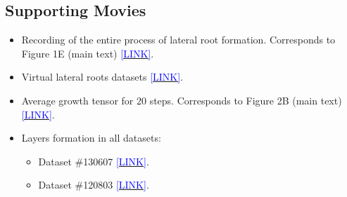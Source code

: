 \documentclass[11pt,a4paper, final]{article}
\newenvironment{Itemize}{
 \begin{itemize}[leftmargin=0.5cm]{
}}{\end{itemize}}
\begin{document}
%


\clearpage
\subsection{Supporting Movies}
\label{sec:suppmovies}

\begin{Itemize}
  \item Recording of the entire process of lateral root formation. Corresponds to Figure 1E (main text) \href{http://youtu.be/navcxqh7KCo}{\textcolor{blue}{[LINK]}}.
  \item Virtual lateral roots datasets \href{https://youtu.be/JbXwgQ3P6h4}{\textcolor{blue}{[LINK]}}.
  \item Average growth tensor for 20 steps. Corresponds to Figure 2B (main text) \href{https://youtu.be/t2hpMR6VFIg}{\textcolor{blue}{[LINK]}}.
  \item Layers formation in all datasets:
  \begin{Itemize}
    \item Dataset \#130607 \href{http://youtu.be/cdY3t1iVRF8}{\textcolor{blue}{[LINK]}}.
    \item Dataset \#120803 \href{http://youtu.be/yXki6QpltZo}{\textcolor{blue}{[LINK]}}.

\end{Itemize}
\end{Itemize}
\end{document}

